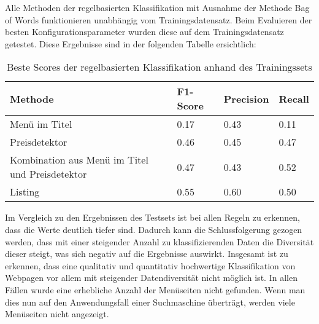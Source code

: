 Alle Methoden der regelbasierten Klassifikation mit Ausnahme der Methode \glqq Bag of Words\grqq{} funktionieren unabhängig vom Trainingsdatensatz.
Beim Evaluieren der besten Konfigurationsparameter wurden diese auf dem Trainingsdatensatz getestet.
Diese Ergebnisse sind in der folgenden Tabelle ersichtlich:
\begin{table}[H]
\caption{Beste Scores der regelbasierten Klassifikation anhand des Trainingssets}
\centering
\begin{tabular}{|l|l|l|l|}
	\hline
	Methode & F1-Score & Precision & Recall\\
	\hline
	Menü im Titel & 0.17 & 0.43 & 0.11 \\
	Preisdetektor & 0.46 & 0.45 & 0.47 \\
	Kombination aus Menü im Titel und Preisdetektor & 0.47 & 0.43 & 0.52\\
	Listing & 0.55 & 0.60 & 0.50\\
	\hline
\end{tabular}
\end{table}

Im Vergleich zu den Ergebnissen des Testsets ist bei allen Regeln zu erkennen, dass die Werte deutlich tiefer sind.
Dadurch kann die Schlussfolgerung gezogen werden, dass mit einer steigender Anzahl zu klassifizierenden Daten die Diversität dieser steigt, was sich negativ auf die Ergebnisse auswirkt.
Insgesamt ist zu erkennen, dass eine qualitativ und quantitativ hochwertige Klassifikation von Webpagen vor allem mit steigender Datendiversität nicht möglich ist.
In allen Fällen wurde eine erhebliche Anzahl der Menüseiten nicht gefunden.
Wenn man dies nun auf den Anwendungsfall einer Suchmaschine überträgt, werden viele Menüseiten nicht angezeigt.
